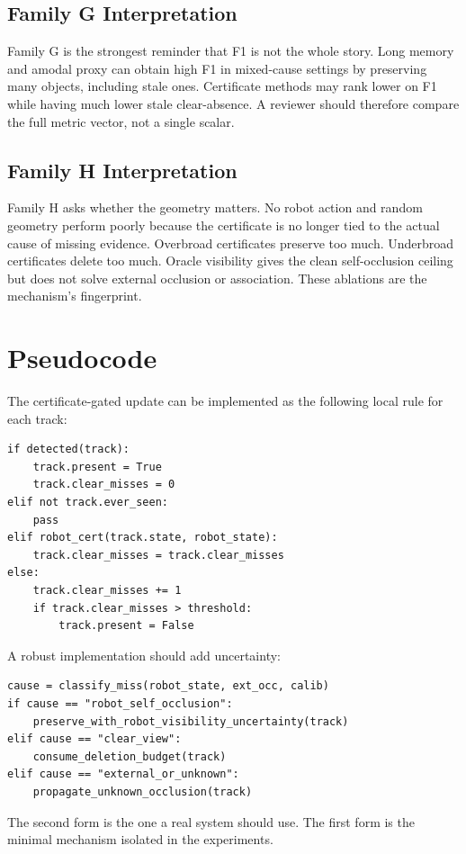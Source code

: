 \documentclass{article}
\begin{document}
\subsection{Family G Interpretation}

Family G is the strongest reminder that F1 is not the whole story. Long memory
and amodal proxy can obtain high F1 in mixed-cause settings by preserving many
objects, including stale ones. Certificate methods may rank lower on F1 while
having much lower stale clear-absence. A reviewer should therefore compare the
full metric vector, not a single scalar.

\subsection{Family H Interpretation}

Family H asks whether the geometry matters. No robot action and random geometry
perform poorly because the certificate is no longer tied to the actual cause of
missing evidence. Overbroad certificates preserve too much. Underbroad
certificates delete too much. Oracle visibility gives the clean self-occlusion
ceiling but does not solve external occlusion or association. These ablations
are the mechanism's fingerprint.

\section{Pseudocode}

The certificate-gated update can be implemented as the following local rule for
each track:
\begin{verbatim}
if detected(track):
    track.present = True
    track.clear_misses = 0
elif not track.ever_seen:
    pass
elif robot_cert(track.state, robot_state):
    track.clear_misses = track.clear_misses
else:
    track.clear_misses += 1
    if track.clear_misses > threshold:
        track.present = False
\end{verbatim}

A robust implementation should add uncertainty:
\begin{verbatim}
cause = classify_miss(robot_state, ext_occ, calib)
if cause == "robot_self_occlusion":
    preserve_with_robot_visibility_uncertainty(track)
elif cause == "clear_view":
    consume_deletion_budget(track)
elif cause == "external_or_unknown":
    propagate_unknown_occlusion(track)
\end{verbatim}
The second form is the one a real system should use. The first form is the
minimal mechanism isolated in the experiments.
\end{document}
